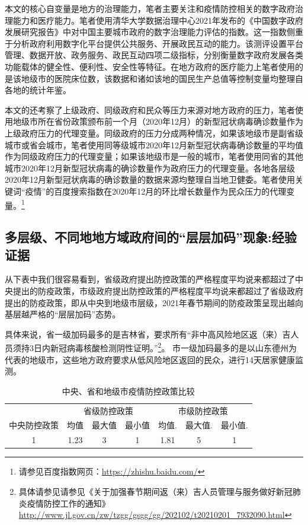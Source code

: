 \documentclass[
  12pt,
]{ctexart}
\begin{document}
本文的核心自变量是地方的治理能力，笔者主要关注和疫情防控相关的数字政府治理能力和医疗能力。笔者使用清华大学数据治理中心2021年发布的《中国数字政府发展研究报告》中对中国主要城市政府的数字治理能力评估的指数。这一指数侧重于分析政府利用数字化平台提供公共服务、开展政民互动的能力。该测评设置平台管理、数据开放、政务服务、政民互动四项二级指标，分别衡量数字政府发展各类功能载体的健全性、便利性、安全性等特征。在地方政府的医疗能力上笔者使用的是该地级市的医院床位数，该数据和诸如该地的国民生产总值等控制变量均整理自各地的统计年鉴。

本文的还考察了上级政府、同级政府和民众等压力来源对地方政府的压力，笔者使用地级市所在省份政策颁布前一个月（2020年12月）的新型冠状病毒确诊数量作为上级政府压力的代理变量。同级政府的压力分成两种情况，如果该地级市是副省级城市或省会城市，笔者使用同等级城市2020年12月新型冠状病毒确诊数量的平均值作为同级政府压力的代理变量；如果该地级市是一般的城市，笔者使用同省的其他城市2020年12月新型冠状病毒的确诊数量作为政府压力的代理变量。各地各层级2020年12月新型冠状病毒的确诊数量的数据来源均整理自当地卫健委。笔者使用关键词``疫情''的百度搜索指数在2020年12月的环比增长数量作为民众压力的代理变量。\footnote{请参见百度指数网页：\url{https://zhishu.baidu.com/}}

\hypertarget{ux591aux5c42ux7ea7ux4e0dux540cux5730ux5730ux65b9ux57dfux653fux5e9cux95f4ux7684ux5c42ux5c42ux52a0ux7801ux73b0ux8c61ux7ecfux9a8cux8bc1ux636e}{%
\subsection{多层级、不同地地方域政府间的``层层加码''现象:经验证据}\label{ux591aux5c42ux7ea7ux4e0dux540cux5730ux5730ux65b9ux57dfux653fux5e9cux95f4ux7684ux5c42ux5c42ux52a0ux7801ux73b0ux8c61ux7ecfux9a8cux8bc1ux636e}}

从下表中我们很容易看到，省级政府提出防控政策的严格程度平均说来都超过了中央提出的防疫政策，市级政府提出防控政策的严格程度平均说来都超过了省级政府提出的防疫政策，即从中央到地级市层级，2021年春节期间的防疫政策呈现出越向基层越严格的``层层加码''态势。

具体来说，省一级加码最多的是吉林省，要求所有``非中高风险地区返（来）吉人员须持3日内新冠病毒核酸检测阴性证明。''\footnote{具体请参见请参见《关于加强春节期间返（来）吉人员管理与服务做好新冠肺炎疫情防控工作的通知》\url{http://www.jl.gov.cn/zw/tzgg/gsgg/gg/202102/t20210201_7932090.html}}。 市一级加码最多的是以山东德州为代表的地级市，这些地方政府要求从低风险地区返回的民众，进行14天居家健康监测。

\begin{table}[!h]

\caption{\label{tab:unnamed-chunk-2}中央、省和地级市疫情防控政策比较}
\centering
\begin{tabular}[t]{ccccccc}
\toprule
\multicolumn{1}{c}{ } & \multicolumn{3}{c}{省级防控政策} & \multicolumn{3}{c}{市级防控政策} \\
\cmidrule(l{3pt}r{3pt}){2-4} \cmidrule(l{3pt}r{3pt}){5-7}
中央防控政策 & 均值 & 最大值 & 最小值 & 均值. & 最大值. & 最小值.\\
\midrule
1 & 1.23 & 3 & 1 & 1.81 & 5 & 1\\
\bottomrule
\end{tabular}
\end{table}
\end{document}

